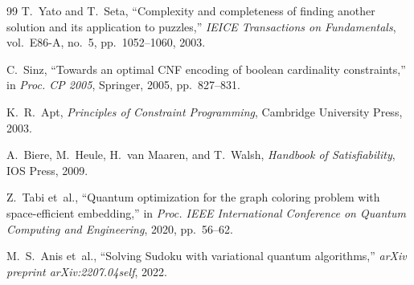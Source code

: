 \documentclass[eng]{ajceam-class}
\begin{document}
\begin{thebibliography}{99}
T.~Yato and T.~Seta, ``Complexity and completeness of finding another solution and its application to puzzles,'' \textit{IEICE Transactions on Fundamentals}, vol.~E86-A, no.~5, pp.~1052--1060, 2003.

C.~Sinz, ``Towards an optimal CNF encoding of boolean cardinality constraints,'' in \textit{Proc. CP 2005}, Springer, 2005, pp.~827--831.

K.~R.~Apt, \textit{Principles of Constraint Programming}, Cambridge University Press, 2003.

A.~Biere, M.~Heule, H.~van Maaren, and T.~Walsh, \textit{Handbook of Satisfiability}, IOS Press, 2009.

Z.~Tabi et~al., ``Quantum optimization for the graph coloring problem with space-efficient embedding,'' in \textit{Proc. IEEE International Conference on Quantum Computing and Engineering}, 2020, pp.~56--62.

M.~S.~Anis et~al., ``Solving Sudoku with variational quantum algorithms,'' \textit{arXiv preprint arXiv:2207.04self}, 2022.

\end{thebibliography}
\end{document}
